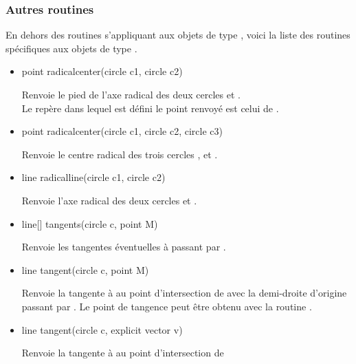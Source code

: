 \documentclass[pdftex]{article}
\begin{document}
\subsubsection{Autres routines}
En dehors des routines s'appliquant aux objets de type ,
voici la liste des routines spécifiques aux objets de type .
\begin{itemize}
\item {}%
    \begin{Vcolor}
    point radicalcenter(circle c1, circle c2)
  \end{Vcolor}
  Renvoie le pied de l'axe radical des deux cercles 
  et .\\
  Le repère dans lequel est défini le point renvoyé est celui de .
\item {}%
    \begin{Vcolor}
    point radicalcenter(circle c1, circle c2, circle c3)
  \end{Vcolor}
  Renvoie le centre radical des trois cercles , 
  et .
\item {}%
    \begin{Vcolor}
    line radicalline(circle c1, circle c2)
  \end{Vcolor}
  Renvoie l'axe radical des deux cercles 
  et .
\item {}%
    \begin{Vcolor}
    line[] tangents(circle c, point M)
  \end{Vcolor}
  Renvoie les tangentes éventuelles à  passant
  par .
\item {}%
  \begin{Vcolor}
    line tangent(circle c, point M)
  \end{Vcolor}
  Renvoie la tangente à  au point d'intersection de 
  avec la demi-droite d'origine  passant par . Le
  point de tangence peut être obtenu avec la routine
  .
\item {}%
  \begin{Vcolor}
    line tangent(circle c, explicit vector v)
  \end{Vcolor}
  Renvoie la tangente à  au point d'intersection de 

\end{itemize}
\end{document}
